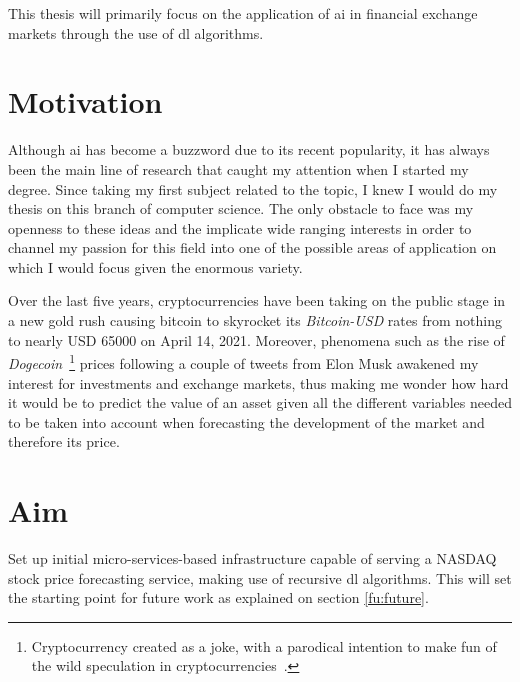 This thesis will primarily focus on the application of \gls{ai} in financial exchange markets through the use of \gls{dl} algorithms.

\section{Motivation}

Although \gls{ai} has become a buzzword due to its recent popularity, it has always been the main line of research that caught my attention when I started my degree. Since taking my first subject related to the topic, I knew I would do my thesis on this branch of computer science. The only obstacle to face was my openness to these ideas and the implicate wide ranging interests in order to channel my passion for this field into one of the possible areas of application on which I would focus given the enormous variety. 

Over the last five years, cryptocurrencies have been taking on the public stage in a new gold rush causing bitcoin to skyrocket its \textit{Bitcoin-USD} rates from nothing to nearly USD 65000 on April 14, 2021. Moreover, phenomena such as the rise of \textit{Dogecoin}~\footnote{Cryptocurrency created as a joke, with a parodical intention to make fun of the wild speculation in cryptocurrencies~\cite{dogeDefinition}.} prices following a couple of tweets from Elon Musk awakened my interest for investments and exchange markets, thus making me wonder how hard it would be to predict the value of an asset given all the different variables needed to be taken into account when forecasting the development of the market and therefore its price.

\section{Aim}

Set up initial micro-services-based infrastructure capable of serving a NASDAQ stock price forecasting service, making use of recursive \gls{dl} algorithms. This will set the starting point for future work as explained on section \ref{fu:future}.

\newpage
